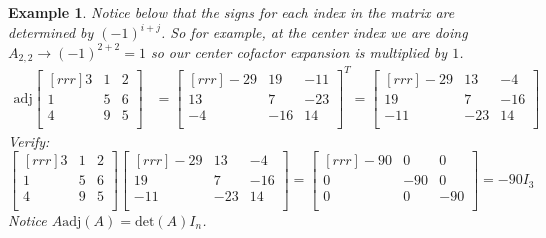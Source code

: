 \documentclass{report}
\newtheorem*{ex}{Example}
\begin{document}
\begin{ex}
Notice below that the signs for each index in the matrix are determined by $(-1)^{i+j}$. So for example, at the center index we are doing $A_{2,2} \rightarrow (-1)^{2+2} = 1$ so our center cofactor expansion is multiplied by $1$.
\begin{align*}
\mathrm{adj}\begin{bmatrix}[rrr]3&1&2\\1&5&6\\4&9&5\\\end{bmatrix} &= \begin{bmatrix}[rrr]-29&19&-11\\13&7&-23\\-4&-16&14\\\end{bmatrix}^T=\begin{bmatrix}[rrr]-29&13&-4\\19&7&-16\\-11&-23&14\\\end{bmatrix}
\end{align*}
Verify:
\[ \begin{bmatrix}[rrr]3&1&2\\1&5&6\\4&9&5\\\end{bmatrix}\begin{bmatrix}[rrr]-29&13&-4\\19&7&-16\\-11&-23&14\\\end{bmatrix} = \begin{bmatrix}[rrr]-90&0&0\\0&-90&0\\0&0&-90\\\end{bmatrix} = -90I_3 \]
Notice $A\mathrm{adj}(A)=\mathrm{det}(A)I_n$.
\end{ex}
\end{document}
